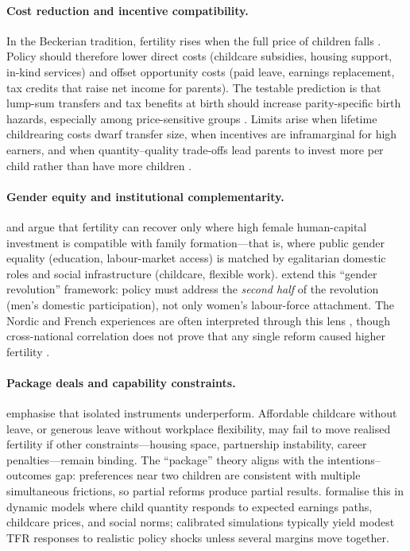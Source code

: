 \documentclass[11pt,a4paper,openany]{book}
\begin{document}
\paragraph{Cost reduction and incentive compatibility.}
In the Beckerian tradition, fertility rises when the full price of children falls \citep{becker1960,doepke2023}. Policy should therefore lower direct costs (childcare subsidies, housing support, in-kind services) and offset opportunity costs (paid leave, earnings replacement, tax credits that raise net income for parents). The testable prediction is that lump-sum transfers and tax benefits at birth should increase parity-specific birth hazards, especially among price-sensitive groups \citep{milligan2005,cohen2013,whittington1990}. Limits arise when lifetime childrearing costs dwarf transfer size, when incentives are inframarginal for high earners, and when quantity--quality trade-offs lead parents to invest more per child rather than have more children \citep{doepke2023}.

\paragraph{Gender equity and institutional complementarity.}
\citet{mcdonald2000} and \citet{mcdonald2006} argue that fertility can recover only where high female human-capital investment is compatible with family formation---that is, where public gender equality (education, labour-market access) is matched by egalitarian domestic roles and social infrastructure (childcare, flexible work). \citet{goldscheider2015} extend this ``gender revolution'' framework: policy must address the \emph{second half} of the revolution (men's domestic participation), not only women's labour-force attachment. The Nordic and French experiences are often interpreted through this lens \citep{castles2003,sobotka2020}, though cross-national correlation does not prove that any single reform caused higher fertility \citep{hoem2008}.

\paragraph{Package deals and capability constraints.}
\citet{gauthier2007,thevenon2011,luci2013,sobotka2020} emphasise that isolated instruments underperform. Affordable childcare without leave, or generous leave without workplace flexibility, may fail to move realised fertility if other constraints---housing space, partnership instability, career penalties---remain binding. The ``package'' theory aligns with the intentions--outcomes gap: preferences near two children are consistent with multiple simultaneous frictions, so partial reforms produce partial results. \citet{doepke2023} formalise this in dynamic models where child quantity responds to expected earnings paths, childcare prices, and social norms; calibrated simulations typically yield modest TFR responses to realistic policy shocks unless several margins move together.
\end{document}
